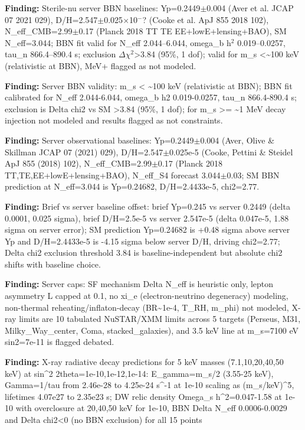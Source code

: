 \documentclass[11pt,a4paper]{article}
\begin{document}
\textbf{Finding:} Sterile-nu server BBN baselines: Yp=0.2449$\pm$0.004 (Aver et al. JCAP 07 2021 029), D/H=2.547$\pm$0.025$\times$10$^-$? (Cooke et al. ApJ 855 2018 102), N\_eff\_CMB=2.99$\pm$0.17 (Planck 2018 TT TE EE+lowE+lensing+BAO), SM N\_eff=3.044; BBN fit valid for N\_eff 2.044--6.044, omega\_b h$^2$ 0.019--0.0257, tau\_n 866.4--890.4 s; exclusion $\Delta$$\chi$$^2$\textgreater{}3.84 (95\%, 1 dof); valid for m\_s \textless{}\textasciitilde{}100 keV (relativistic at BBN), MeV+ flagged as not modeled.

\textbf{Finding:} Server BBN validity: m\_s \textless{} \textasciitilde{}100 keV (relativistic at BBN); BBN fit calibrated for N\_eff 2.044-6.044, omega\_b h2 0.019-0.0257, tau\_n 866.4-890.4 s; exclusion is Delta chi2 vs SM \textgreater{}3.84 (95\%, 1 dof); for m\_s \textgreater{}= \textasciitilde{}1 MeV decay injection not modeled and results flagged as not constraints.

\textbf{Finding:} Server observational baselines: Yp=0.2449$\pm$0.004 (Aver, Olive \& Skillman JCAP 07 (2021) 029), D/H=2.547$\pm$0.025e-5 (Cooke, Pettini \& Steidel ApJ 855 (2018) 102), N\_eff\_CMB=2.99$\pm$0.17 (Planck 2018 TT,TE,EE+lowE+lensing+BAO), N\_eff\_S4 forecast 3.044$\pm$0.03; SM BBN prediction at N\_eff=3.044 is Yp=0.24682, D/H=2.4433e-5, chi2=2.77.

\textbf{Finding:} Brief vs server baseline offset: brief Yp=0.245 vs server 0.2449 (delta 0.0001, 0.025 sigma), brief D/H=2.5e-5 vs server 2.547e-5 (delta 0.047e-5, 1.88 sigma on server error); SM prediction Yp=0.24682 is +0.48 sigma above server Yp and D/H=2.4433e-5 is -4.15 sigma below server D/H, driving chi2=2.77; Delta chi2 exclusion threshold 3.84 is baseline-independent but absolute chi2 shifts with baseline choice.

\textbf{Finding:} Server caps: SF mechanism Delta N\_eff is heuristic only, lepton asymmetry L capped at 0.1, no xi\_e (electron-neutrino degeneracy) modeling, non-thermal reheating/inflaton-decay (BR\textasciitilde{}1e-4, T\_RH, m\_phi) not modeled, X-ray limits are 10 tabulated NuSTAR/XMM limits across 5 targets (Perseus, M31, Milky\_Way\_center, Coma, stacked\_galaxies), and 3.5 keV line at m\_s=7100 eV sin2=7e-11 is flagged debated.

\textbf{Finding:} X-ray radiative decay predictions for 5 keV masses (7.1,10,20,40,50 keV) at sin\textasciicircum{}2 2theta=1e-10,1e-12,1e-14: E\_gamma=m\_s/2 (3.55-25 keV), Gamma=1/tau from 2.46e-28 to 4.25e-24 s\textasciicircum{}-1 at 1e-10 scaling as (m\_s/keV)\textasciicircum{}5, lifetimes 4.07e27 to 2.35e23 s; DW relic density Omega\_s h\textasciicircum{}2=0.047-1.58 at 1e-10 with overclosure at 20,40,50 keV for 1e-10, BBN Delta N\_eff 0.0006-0.0029 and Delta chi2\textless{}0 (no BBN exclusion) for all 15 points
\end{document}

